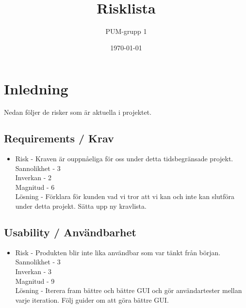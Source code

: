 

\ifpdf
\else
\fi

\title{Risklista}
\author{PUM-grupp 1}
\date{\today}



\maketitle\thispagestyle{empty}

\newpage

\setcounter{tocdepth}{2}
\newpage

\section{Inledning}

Nedan följer de risker som är aktuella i projektet.



\subsection{Requirements / Krav}
\begin{itemize}
\item Risk - Kraven är ouppnåeliga för oss under detta tidsbegränsade projekt.
\\Sannolikhet - 3
\\Inverkan - 2
\\Magnitud - 6
\\Lösning - Förklara för kunden vad vi tror att vi kan och inte kan slutföra under detta projekt. Sätta upp ny kravlista.
\end{itemize}

\subsection{Usability / Användbarhet}
\begin{itemize}
\item Risk - Produkten blir inte lika användbar som var tänkt från början.
\\Sannolikhet - 3
\\Inverkan - 3
\\Magnitud - 9
\\Lösning - Iterera fram bättre och bättre GUI och gör användartester mellan varje iteration. Följ guider om att göra bättre GUI.
\end{itemize}

